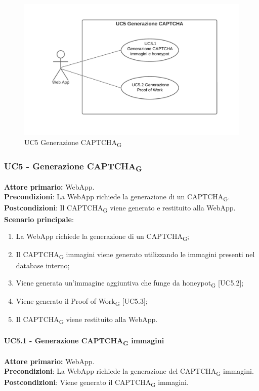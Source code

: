 \begin{figure}[H]
    \centering
    \includegraphics[scale=0.6]{img/generazione.png}
    \caption{UC5 Generazione CAPTCHA\textsubscript{G}}
\end{figure}

\subsubsection{UC5 - Generazione CAPTCHA\textsubscript{G}}
\textbf{Attore primario:} WebApp.\\
\textbf{Precondizioni}: La WebApp richiede la generazione di un CAPTCHA\textsubscript{G}.\\
\textbf{Postcondizioni}: Il CAPTCHA\textsubscript{G} viene generato e restituito alla WebApp.\\

\textbf{Scenario principale}:
\begin{enumerate}
    \item La WebApp richiede la generazione di un CAPTCHA\textsubscript{G};
    \item Il CAPTCHA\textsubscript{G} immagini viene generato utilizzando le immagini presenti nel database interno;
    \item Viene generata un'immagine aggiuntiva che funge da honeypot\textsubscript{G} [UC5.2];
    \item Viene generato il Proof of Work\textsubscript{G} [UC5.3];
    \item Il CAPTCHA\textsubscript{G} viene restituito alla WebApp.
\end{enumerate}

\paragraph{UC5.1  - Generazione CAPTCHA\textsubscript{G} immagini}
\textbf{Attore primario:} WebApp.\\
\textbf{Precondizioni}: La WebApp richiede la generazione del CAPTCHA\textsubscript{G} immagini.\\
\textbf{Postcondizioni}: Viene generato il CAPTCHA\textsubscript{G} immagini.\\

